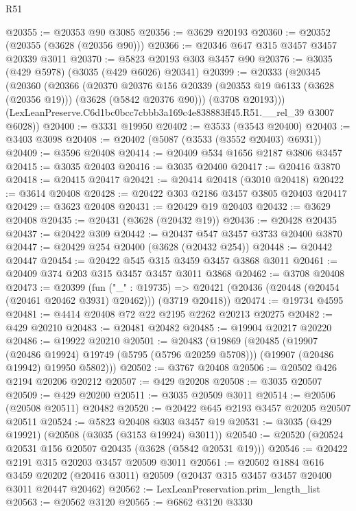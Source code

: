\begin{lexlean}{R51}
\begin{coremodule}
@20355 := @20353 @90 @3085
@20356 := @3629 @20193
@20360 := @20352 (@20355 (@3628 (@20356 @90)))
@20366 := @20346 @647 @315 @3457 @3457 @20339 @3011
@20370 := @5823 @20193 @303 @3457 @90
@20376 := @3035 (@429 @5978) (@3035 (@429 @6026) @20341)
@20399 := @20333
    (@20345
      (@20360
        (@20366
          (@20370
            @20376
            @156
            @20339
            (@20353 @19 @6133 (@3628 (@20356 @19)))
            (@3628 (@5842 @20376 @90)))
          (@3708 @20193)))
      (LexLeanPreserve.C6d1bc0bcc7cbbb3a169c4e838883ff45.R51.__rel_39 @3007 @6028))
@20400 := @3331 @19950
@20402 := @3533 (@3543 @20400)
@20403 := @3403 @3098
@20408 := @20402 (@5087 (@3533 (@3552 @20403) @6931))
@20409 := @3596 @20408
@20414 := @20409 @534 @1656 @2187 @3806 @3457
@20415 := @3035 @20403
@20416 := @3035 @20400
@20417 := @20416 @3870
@20418 := @20415 @20417
@20421 := @20414 @20418 (@3010 @20418)
@20422 := @3614 @20408
@20428 := @20422 @303 @2186 @3457 @3805 @20403 @20417
@20429 := @3623 @20408
@20431 := @20429 @19 @20403
@20432 := @3629 @20408
@20435 := @20431 (@3628 (@20432 @19))
@20436 := @20428 @20435
@20437 := @20422 @309
@20442 := @20437 @547 @3457 @3733 @20400 @3870
@20447 := @20429 @254 @20400 (@3628 (@20432 @254))
@20448 := @20442 @20447
@20454 := @20422 @545 @315 @3459 @3457 @3868 @3011
@20461 := @20409 @374 @203 @315 @3457 @3457 @3011 @3868
@20462 := @3708 @20408
@20473 := @20399
    (fun ("_" : @19735) =>
    @20421 (@20436 (@20448 (@20454 (@20461 @20462 @3931) @20462))) (@3719 @20418))
@20474 := @19734 @4595
@20481 := @4414 @20408 @72 @22 @2195 @2262 @20213 @20275
@20482 := @429 @20210
@20483 := @20481 @20482
@20485 := @19904 @20217 @20220
@20486 := @19922 @20210
@20501 := @20483
    (@19869
      (@20485
        (@19907 (@20486 @19924) @19749 (@5795 (@5796 @20259 @5708)))
        (@19907 (@20486 @19942) @19950 @5802)))
@20502 := @3767 @20408
@20506 := @20502 @426 @2194 @20206 @20212
@20507 := @429 @20208
@20508 := @3035 @20507
@20509 := @429 @20200
@20511 := @3035 @20509 @3011
@20514 := @20506 (@20508 @20511) @20482
@20520 := @20422 @645 @2193 @3457 @20205 @20507 @20511
@20524 := @5823 @20408 @303 @3457 @19
@20531 := @3035 (@429 @19921) (@20508 (@3035 (@3153 @19924) @3011))
@20540 := @20520 (@20524 @20531 @156 @20507 @20435 (@3628 (@5842 @20531 @19)))
@20546 := @20422 @2191 @315 @20203 @3457 @20509 @3011
@20561 := @20502
    @1884
    @616
    @3459
    @20202
    (@20416 @3011)
    @20509
    (@20437 @315 @3457 @3457 @20400 @3011 @20447 @20462)
@20562 := LexLeanPreservation.prim_length_list
@20563 := @20562 @3120
@20565 := @6862 @3120 @3330

\end{coremodule}
\end{lexlean}
